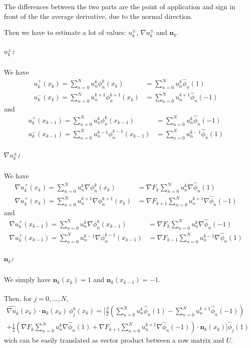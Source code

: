 \documentclass[a4paper,10pt,draft]{article}
\begin{document}
{The differences between the two parts are the point of application and sign in front of the the 
average derivative, due to the normal direction.

Then we have to estimate a lot of values: $u^\pm_k$, $\nabla u^\pm_k$ and $\mathbf{n}_k$.

\subparagraph{$u^\pm_k$:}
We have
\begin{align*}
 u^+_k(x_k) = \sum_{n=0}^N u_n^k \phi_n^k(x_k) &= \sum_{n=0}^N u_n^k \hat \phi_n(1) \\
 u^-_k(x_k) = \sum_{n=0}^N u_n^{k+1} \phi_n^{k+1}(x_k) &= \sum_{n=0}^N u_n^{k+1} \hat 
\phi_n(-1)
\end{align*}
and
\begin{align*}
 u^+_k(x_{k-1}) = \sum_{n=0}^N u_n^k \phi_n^k(x_{k-1}) &= \sum_{n=0}^N u_n^k \hat \phi_n(-1) 
\\
 u^-_k(x_{k-1}) = \sum_{n=0}^N u_n^{k-1} \phi_n^{k-1}(x_{k-1}) &= \sum_{n=0}^N u_n^{k-1} \hat 
\phi_n(1)
\end{align*}

\subparagraph{$\nabla u^\pm_k$:} We have
\begin{align*}
 \nabla u^+_k(x_k) = \sum_{n=0}^N u_n^k \nabla \phi_n^k(x_k) &= \nabla F_k \sum_{n=0}^N 
u_n^k \nabla \hat \phi_n(1) \\
\nabla u^+_k(x_k) = \sum_{n=0}^N u_n^{k+1} \nabla \phi_n^{k+1}(x_k) &= \nabla F_{k+1} 
\sum_{n=0}^N u_n^{k+1} \nabla \hat \phi_n(-1)
\end{align*}
and
\begin{align*}
 \nabla u^+_k(x_{k-1}) = \sum_{n=0}^N u_n^k \nabla \phi_n^k(x_{k-1}) &= \nabla F_k \sum_{n=0}^N 
u_n^k \nabla \hat \phi_n(-1) \\
\nabla u^+_k(x_{k-1}) = \sum_{n=0}^N u_n^{k-1} \nabla \phi_n^{k-1}(x_{k-1}) &= \nabla F_{k-1} 
\sum_{n=0}^N 
u_n^{k-1} \nabla \hat \phi_n(1)
\end{align*}

\subparagraph{$\mathbf{n}_k$:} We simply have $\mathbf{n}_k(x_k) = 1$ and $\mathbf{n}_k(x_{k-1}) = 
-1$.

\paragraph{}

Then, for $j=0,\dots,N$,
\begin{multline*}
 \widehat{\nabla u}_k(x_k) \cdot \mathbf{n}_k(x_k)\ \phi_j^k(x_k) 
 = \Bigg[ \frac{\beta}{2} \left( \sum_{n=0}^N u_n^k \hat \phi_n(1) - \sum_{n=0}^N u_n^{k+1} 
\hat 
\phi_n(-1) \right) 
\\+ \frac{1}{2} \left(\nabla F_k \sum_{n=0}^N u_n^k \nabla \hat \phi_n(1) + \nabla F_{k+1} 
\sum_{n=0}^N u_n^{k+1} \nabla \hat \phi_n(-1) \right) \cdot \mathbf{n}_k(x_k) \Bigg] 
\hat \phi_j(1)
\end{multline*}
wich can be easily translated as vector product between a row matrix and $U$.

}
\end{document}
